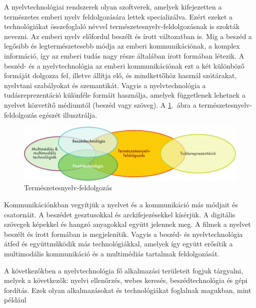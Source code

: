 
  \begin{multicols}{2}

  A nyelvtechnológiai rendszerek olyan szoft\-ve\-rek, amelyek kifejezetten a természetes emberi nyelv feldolgozására lettek specializálva. Ezért ezeket a technológiákat összefoglaló névvel természetesnyelv-fel\-dol\-go\-zás\-nak is szokták nevezni. Az emberi nyelv előfordul beszélt és írott változatban is. Míg a beszéd a legősibb és legtermészetesebb módja az emberi kommunikációnak, a komplex információ, így az emberi tudás nagy része általában írott formában létezik. A beszéd- és a nyelvtechnológia az emberi kommunikációnak ezt a két különböző formáját dolgozza fel, illetve állítja elő, és mindkettőhöz használ szótárakat, nyelvtani szabályokat és szemantikát. Vagyis a nyelvtechnológia a tudásreprezentáció különféle formáit használja, amelyek függetlenek lehetnek a nyelvet közvetítő médiumtól (beszéd vagy szöveg). A \ref{fig:ltincontext_de}.~ábra a természetesnyelv-feldolgozás egészét illusztrálja.

  \begin{figure}[htb]
    \center
    \includegraphics[width=\textwidth]{../_media/hungarian/language_technologies}
    \caption{Természetesnyelv-feldolgozás}
    \label{fig:ltincontext_de}
  \end{figure}

  Kommunikációnkban ve\-gyít\-jük a nyelvet és a kommunikáció más módjait és csatornáit. A beszédet gesztusokkal és arckifejezésekkel kísérjük. A digitális szövegek képekkel és hangzó anyagokkal együtt jelennek meg. A filmek a nyelvet beszélt és írott formában is megjelenítik. Vagyis a beszéd- és nyelvtechnológia átfed és együttműködik más technológiákkal, amelyek így együtt erősítik a multimodális kommunikáció és a multimédiás tartalmak feldolgozását. 

  A következőkben a nyelvtechnológia fő alkalmazási területeit fogjuk tárgyalni, melyek a következők: nyelvi ellenőrzés, webes keresés, beszédtechnológia és gépi fordítás. Ezek olyan alkalmazásokat és technológiákat foglalnak magukban, mint például


\end{multicols}
